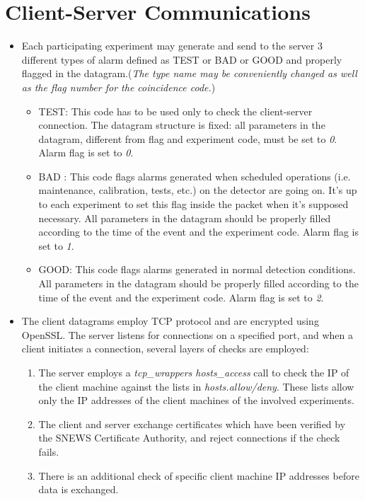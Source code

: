 \documentclass{article}
\begin{document}
\section{Client-Server Communications}\label{alarm}
\begin{itemize}
\item Each participating experiment may generate and send to the server
3 different types of alarm defined as TEST or BAD or GOOD and 
properly flagged in the datagram.({\it The type name may be conveniently 
changed as well as the flag number for the coincidence code.})
\begin{itemize}
\item TEST: This code has to be used only to check the client-server
connection. The datagram structure is fixed: all parameters in the
datagram, different from flag and
experiment code, must be set to {\it 0}. Alarm flag is set to {\it 0}. 

\item BAD : This code flags alarms generated when scheduled operations
(i.e. maintenance, calibration, tests, etc.) on the detector are going on. It's
up to each experiment to set this flag inside the packet when it's supposed
necessary. 
All parameters in the datagram should be properly filled according
to the time of the event and the experiment code. Alarm flag is set to 
{\it 1}.

\item GOOD: This code flags alarms generated in normal detection conditions.
All parameters in the datagram should be properly filled according
to the time of the event and the experiment code. Alarm flag is set to 
{\it 2}.
\end{itemize}
 

\item The client datagrams employ TCP protocol and 
are encrypted using OpenSSL.  
The server listens for connections on a specified port,
and when a client initiates a connection, several layers
of checks are employed:
\begin{enumerate}
\item The server employs a {\it tcp\_wrappers hosts\_access}
call to check the IP of the client machine against the lists in
{\it hosts.allow/deny}.  These lists allow only the IP addresses
of the client machines of the involved experiments.
\item
The client and server exchange certificates which have been
verified by the SNEWS Certificate Authority, and reject
connections if the check fails.
\item There is an additional check of specific client machine
IP addresses before data is exchanged.
\end{enumerate}
\end{itemize}
\end{document}
